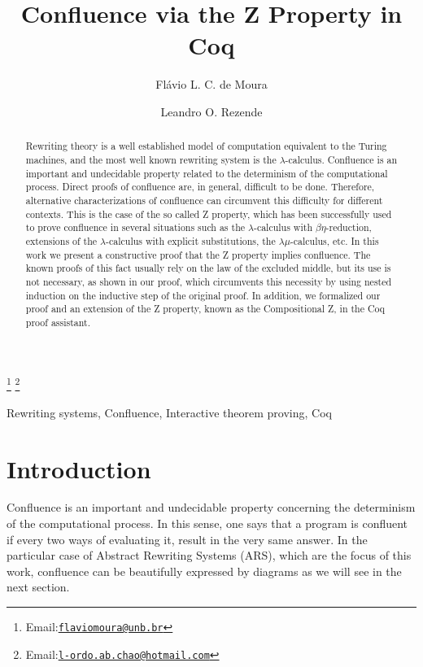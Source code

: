 \documentclass{entcs}
\begin{document}
\begin{frontmatter}
  \title{Confluence via the Z Property in Coq}
  \author{Flávio L. C. de Moura}
  \author{Leandro O. Rezende}
  \address{Departamento de Ciência da Computação, Universidade de Brasília, Brasília, Brazil}
  \thanks[flaviomoura]{Email:\href{flaviomoura@unb.br}{\texttt{\normalshape flaviomoura@unb.br}}} 
  \thanks[leandro]{Email:\href{l-ordo.ab.chao@hotmail.com}{\texttt{\normalshape l-ordo.ab.chao@hotmail.com}}}
  
\begin{abstract}
  Rewriting theory is a well established model of computation
  equivalent to the Turing machines, and the most well known rewriting
  system is the $\lambda$-calculus. Confluence is an important and
  undecidable property related to the determinism of the computational
  process. Direct proofs of confluence are, in general, difficult to
  be done. Therefore, alternative characterizations of confluence can
  circumvent this difficulty for different contexts. This is the case
  of the so called Z property, which has been successfully used to
  prove confluence in several situations such as the
  $\lambda$-calculus with $\beta\eta$-reduction, extensions of the
  $\lambda$-calculus with explicit substitutions, the
  $\lambda\mu$-calculus, etc. In this work we present a constructive
  proof that the Z property implies confluence. The known proofs of
  this fact usually rely on the law of the excluded middle, but its use is not necessary, 
  as shown in our proof, which circumvents this necessity by using nested induction 
  on the inductive step of the original proof. 
  In addition, we formalized our proof and an extension of the Z
  property, known as the Compositional Z, in the Coq proof assistant.
\end{abstract}

\begin{keyword}
  Rewriting systems, Confluence, Interactive theorem proving, Coq
\end{keyword}
\end{frontmatter}

\section{Introduction}



Confluence is an important and undecidable property concerning the
determinism of the computational process. In this sense, one says that
a program is confluent if every two ways of evaluating it, result in
the very same answer. In the particular case of Abstract Rewriting
Systems (ARS), which are the focus of this work, confluence can be
beautifully expressed by diagrams as we will see in the next section.
\end{document}
